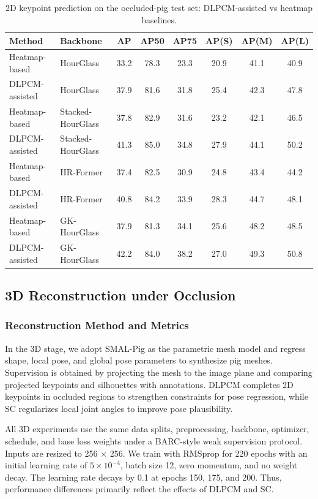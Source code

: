 \documentclass[computers,article,submit,pdftex,moreauthors]{mdpi}
\begin{document}
\begin{table}[H]
\caption{2D keypoint prediction on the occluded-pig test set: DLPCM-assisted vs heatmap baselines.}
\label{tab:2d_keypoint}
\centering
\begin{tabular}{llcccccc}
\toprule
\textbf{Method} & \textbf{Backbone} & \textbf{AP} & \textbf{AP50} & \textbf{AP75} & \textbf{AP(S)} & \textbf{AP(M)} & \textbf{AP(L)} \\
\midrule
Heatmap-based & HourGlass & 33.2 & 78.3 & 23.3 & 20.9 & 41.1 & 40.9 \\
DLPCM-assisted & HourGlass & 37.9 & 81.6 & 31.8 & 25.4 & 42.3 & 47.8 \\
Heatmap-based & Stacked-HourGlass & 37.8 & 82.9 & 31.6 & 23.2 & 42.1 & 46.5 \\
DLPCM-assisted & Stacked-HourGlass & 41.3 & 85.0 & 34.8 & 27.9 & 44.1 & 50.2 \\
Heatmap-based & HR-Former & 37.4 & 82.5 & 30.9 & 24.8 & 43.4 & 44.2 \\
DLPCM-assisted & HR-Former & 40.8 & 84.2 & 33.9 & 28.3 & 44.7 & 48.1 \\
Heatmap-based & GK-HourGlass & 37.9 & 81.3 & 34.1 & 25.6 & 48.2 & 48.5 \\
DLPCM-assisted & GK-HourGlass & 42.2 & 84.0 & 38.2 & 27.0 & 49.3 & 50.8 \\
\bottomrule
\end{tabular}
\end{table}

\subsection{3D Reconstruction under Occlusion}\label{sec:3d_recon}

\subsubsection{Reconstruction Method and Metrics}\label{sec:3d_method}

In the 3D stage, we adopt SMAL-Pig as the parametric mesh model and regress shape, local pose, and global pose parameters to synthesize pig meshes. Supervision is obtained by projecting the mesh to the image plane and comparing projected keypoints and silhouettes with annotations. DLPCM completes 2D keypoints in occluded regions to strengthen constraints for pose regression, while SC regularizes local joint angles to improve pose plausibility.

All 3D experiments use the same data splits, preprocessing, backbone, optimizer, schedule, and base loss weights under a BARC-style weak supervision protocol. Inputs are resized to 256 × 256. We train with RMSprop for 220 epochs with an initial learning rate of $5 \times 10^{-4}$, batch size 12, zero momentum, and no weight decay. The learning rate decays by 0.1 at epochs 150, 175, and 200. Thus, performance differences primarily reflect the effects of DLPCM and SC.
\end{document}
